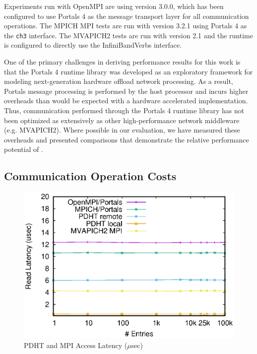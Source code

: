 Experiments run with OpenMPI are using version 3.0.0, which has been configured
to use Portals 4 as the message transport layer for all communication
operations. The MPICH MPI tests are run with version 3.2.1 using Portals 4 as
the {\tt ch3} interface. The MVAPICH2 tests are run with version 2.1 and the
runtime is configured to directly use the InfiniBand\othertm Verbs interface.

One of the primary challenges in deriving performance results for this work is
that the Portals 4 runtime library was developed as an exploratory framework
for modeling next-generation hardware offload network processing. As a result,
Portals message processing is performed by the host processor and
incurs higher overheads than would be expected with a hardware accelerated
implementation. Thus, communication performed through the Portals 4 runtime
library has not been optimized as extensively as other high-performance network
middleware (e.g. MVAPICH2). Where possible in our evaluation, we have measured
these overheads and presented comparisons that demonstrate the relative
performance potential of \pdht.






\subsection{Communication Operation Costs}

\begin{figure}[ht]
  \center
  \includegraphics[width=.95\linewidth]{plots/mpilatency}
  \caption{PDHT and MPI Access Latency ($\mu$sec)}
  \label{fig:all-latency}
\end{figure}

